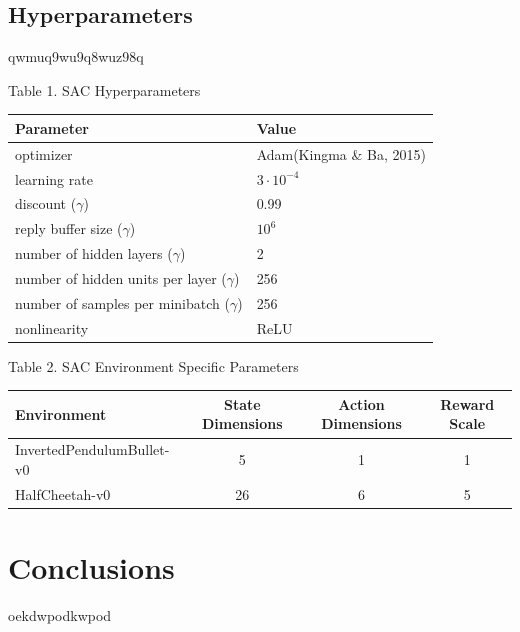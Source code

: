 \documentclass[12pt]{article}
\begin{document}
\subsection*{Hyperparameters}

qwmuq9wu9q8wuz98q
\newline

Table 1. SAC Hyperparameters
\begin{center}
\begin{tabular}{ l|l } 
 \hline
 Parameter & Value \\ 
 \hline\hline
 optimizer & Adam(Kingma \& Ba, 2015) \\ 
 learning rate & $3\cdot10^{-4}$ \\ 
 discount ($\gamma$) & 0.99 \\
 reply buffer size ($\gamma$) & $10^6$ \\
 number of hidden layers ($\gamma$) & 2 \\
 number of hidden units per layer ($\gamma$) & 256 \\
 number of samples per minibatch ($\gamma$) & 256 \\
 nonlinearity & ReLU \\
 \hline
\end{tabular}
\end{center}

Table 2. SAC Environment Specific Parameters
\begin{center}
\begin{tabular}{ l c c c } 
 \hline
 Environment & State Dimensions & Action Dimensions & Reward Scale \\ 
 \hline\hline
 InvertedPendulumBullet-v0 & 5 & 1 & 1 \\
 HalfCheetah-v0 & 26 & 6 & 5 \\ 
 \hline
\end{tabular}
\end{center}


\nocite{*}

\pagebreak

\section*{Conclusions}

\noindent
oekdwpodkwpod



\pagebreak




\end{document}
